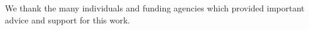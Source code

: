 
We thank the many individuals and funding agencies which provided important advice and support for this work.
